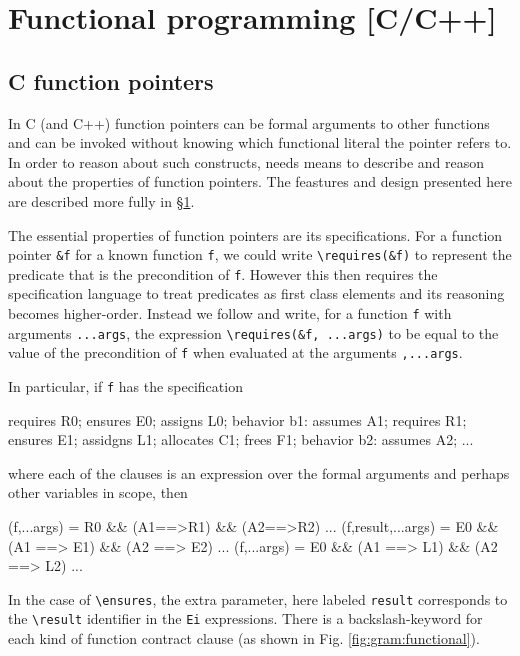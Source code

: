 \section{Functional programming [C/C++]}
\label{sec:functional}

\experimental

\subsection{C function pointers}

In C (and C++) function pointers can be formal arguments to other functions and can be invoked without knowing which functional literal the pointer refers to. 
In order to reason about such constructs, \NAME needs means to describe and reason about the properties of function pointers. The feastures and design presented here are
described more fully in \S\ref{sec:functional}.

The essential properties of function pointers are its specifications. For a function pointer \lstinline|&f| for a known function \lstinline|f|,  we could write \lstinline|\requires(&f)| to represent the predicate that is the precondition of \lstinline|f|. However this then requires the specification language to treat predicates as first class elements and its reasoning becomes higher-order. Instead we follow \cite{20.500.11850/153152} and write, for a function \lstinline|f| with arguments \lstinline|...args|, the expression \lstinline|\requires(&f, ...args)| to be equal to the  value of
the precondition of \lstinline|f| when evaluated at the arguments \lstinline|,...args|.

In particular, if \lstinline|f| has the specification
\begin{listing-nonumber}
requires R0;
ensures E0;
assigns L0;
behavior b1:
  assumes A1;
  requires R1;
  ensures E1;
  assidgns L1;
  allocates C1;
  frees F1;
behavior b2:
  assumes A2;
  ...
\end{listing-nonumber}
where each of the clauses is an expression over the formal arguments and perhaps other variables in scope, then

\begin{listing-nonumber}
\requires(f,...args) = R0 && (A1==>R1) && (A2==>R2) ...
\ensures(f,result,...args) = E0 && (A1 ==> E1) && (A2 ==> E2) ...
\assigns(f,...args) = E0 && (A1 ==> L1) && (A2 ==> L2) ...
\end{listing-nonumber}
In the case of \lstinline|\ensures|, the extra parameter, here labeled \lstinline|result| corresponds to the \lstinline|\result| identifier in the \lstinline|Ei| expressions.
There is a backslash-keyword for each kind of function contract clause (as shown in Fig. \ref{fig:gram:functional}).

